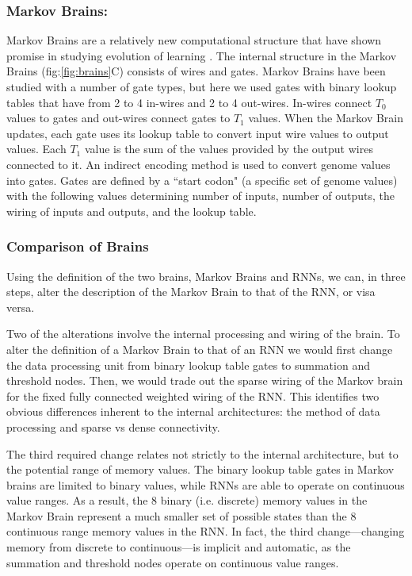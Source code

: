 \subsubsection{Markov Brains:}
Markov Brains are a relatively new computational structure that have shown promise in studying evolution of learning \citep{hintze_markov_2017, edlund_integrated_2011, sheneman_evolving_2017}. 
The internal structure in the Markov Brains (fig:\ref{fig:brains}C) consists of wires and gates. 
Markov Brains have been studied with a number of gate types, but here we used gates with binary lookup tables that have from 2 to 4 in-wires and 2 to 4 out-wires. 
In-wires connect $T_0$ values to gates and out-wires connect gates to $T_1$ values. 
When the Markov Brain updates, each gate uses its lookup table to convert input wire values to output values. 
Each $T_1$ value is the sum of the values provided by the output wires connected to it.
An indirect encoding method is used to convert genome values into gates. 
Gates are defined by a ``start codon" (a specific set of genome values) with the following values determining number of inputs, number of outputs, the wiring of inputs and outputs, and the lookup table.

\subsubsection{Comparison of Brains}

Using the definition of the two brains, Markov Brains and RNNs, we can, in three steps, alter the description of the Markov Brain to that of the RNN, or visa versa.

Two of the alterations involve the internal processing and wiring of the brain. 
To alter the definition of a Markov Brain to that of an RNN we would first change the data processing unit from binary lookup table gates to summation and threshold nodes. 
Then, we would trade out the sparse wiring of the Markov brain for the fixed fully connected weighted wiring of the RNN.
This identifies two obvious differences inherent to the internal architectures: the method of data processing and sparse vs dense connectivity.

The third required change relates not strictly to the internal architecture, but to the potential range of memory values. 
The binary lookup table gates in Markov brains are limited to binary values, while RNNs are able to operate on continuous value ranges. 
As a result, the 8 binary (i.e. discrete) memory values in the Markov Brain represent a much smaller set of possible states than the 8 continuous range memory values in the RNN. 
In fact, the third change---changing memory from discrete to continuous---is implicit and automatic, as the summation and threshold nodes operate on continuous value ranges.

